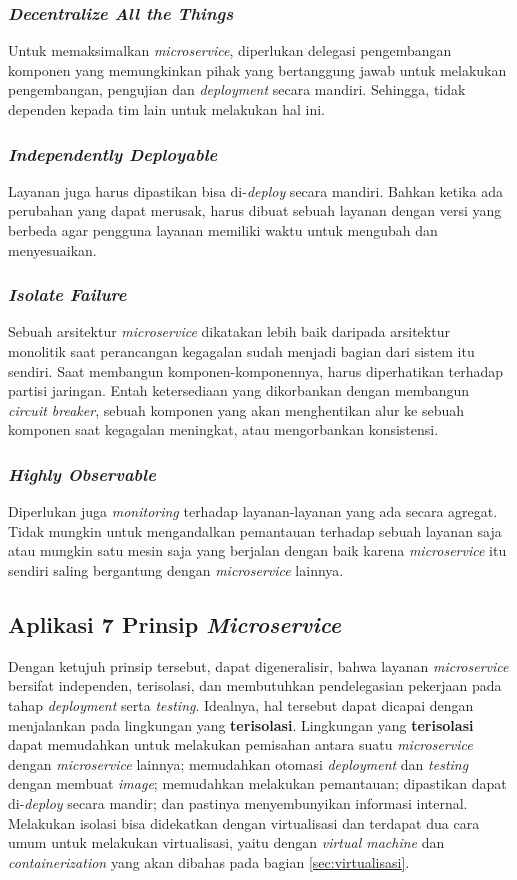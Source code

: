 \subsubsection{\emph{Decentralize All the Things}}
Untuk memaksimalkan \emph{microservice}, diperlukan delegasi pengembangan komponen yang memungkinkan pihak yang bertanggung jawab untuk melakukan pengembangan, pengujian dan \emph{deployment} secara mandiri. Sehingga, tidak dependen kepada tim lain untuk melakukan hal ini.

\subsubsection{\emph{Independently Deployable}}
Layanan juga harus dipastikan bisa di-\emph{deploy} secara mandiri. Bahkan ketika ada perubahan yang dapat merusak, harus dibuat sebuah layanan dengan versi yang berbeda agar pengguna layanan memiliki waktu untuk mengubah dan menyesuaikan.

\subsubsection{\emph{Isolate Failure}}
Sebuah arsitektur \emph{microservice} dikatakan lebih baik daripada arsitektur monolitik saat perancangan kegagalan sudah menjadi bagian dari sistem itu sendiri. Saat membangun komponen-komponennya, harus diperhatikan terhadap partisi jaringan. Entah ketersediaan yang dikorbankan dengan membangun \emph{circuit breaker}, sebuah komponen yang akan menghentikan alur ke sebuah komponen saat kegagalan meningkat, atau mengorbankan konsistensi.

\subsubsection{\emph{Highly Observable}}
Diperlukan juga \emph{monitoring} terhadap layanan-layanan yang ada secara agregat. Tidak mungkin untuk mengandalkan pemantauan terhadap sebuah layanan saja atau mungkin satu mesin saja yang berjalan dengan baik karena \emph{microservice} itu sendiri saling bergantung dengan \emph{microservice} lainnya.

\subsection{Aplikasi 7 Prinsip \emph{Microservice}}
Dengan ketujuh prinsip tersebut, dapat digeneralisir, bahwa layanan \emph{microservice} bersifat independen, terisolasi, dan membutuhkan pendelegasian pekerjaan pada tahap \emph{deployment} serta \emph{testing}. Idealnya, hal tersebut dapat dicapai dengan menjalankan pada lingkungan yang \textbf{terisolasi}. Lingkungan yang \textbf{terisolasi} dapat memudahkan untuk melakukan pemisahan antara suatu \emph{microservice} dengan \emph{microservice} lainnya; memudahkan otomasi \emph{deployment} dan \emph{testing} dengan membuat \emph{image}; memudahkan melakukan pemantauan; dipastikan dapat di-\emph{deploy} secara mandir; dan pastinya menyembunyikan informasi internal. Melakukan isolasi bisa didekatkan dengan virtualisasi dan terdapat dua cara umum untuk melakukan virtualisasi, yaitu dengan \emph{virtual machine} dan \emph{containerization} yang akan dibahas pada bagian \ref{sec:virtualisasi}.


